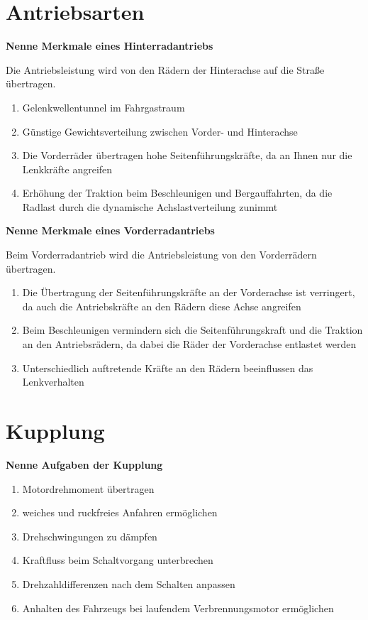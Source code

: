 \section{Antriebsarten}\label{antriebsarten}

\textbf{Nenne Merkmale eines Hinterradantriebs}

Die Antriebsleistung wird von den Rädern der Hinterachse auf die Straße
übertragen.

\begin{enumerate}
\item
  Gelenkwellentunnel im Fahrgastraum
\item
  Günstige Gewichtsverteilung zwischen Vorder- und Hinterachse
\item
  Die Vorderräder übertragen hohe Seitenführungskräfte, da an Ihnen nur
  die Lenkkräfte angreifen
\item
  Erhöhung der Traktion beim Beschleunigen und Bergauffahrten, da die
  Radlast durch die dynamische Achslastverteilung zunimmt
\end{enumerate}

\textbf{Nenne Merkmale eines Vorderradantriebs}

Beim Vorderradantrieb wird die Antriebsleistung von den Vorderrädern
übertragen.

\begin{enumerate}
\item
  Die Übertragung der Seitenführungskräfte an der Vorderachse ist
  verringert, da auch die Antriebskräfte an den Rädern diese Achse
  angreifen
\item
  Beim Beschleunigen vermindern sich die Seitenführungskraft und die
  Traktion an den Antriebsrädern, da dabei die Räder der Vorderachse
  entlastet werden
\item
  Unterschiedlich auftretende Kräfte an den Rädern beeinflussen das
  Lenkverhalten
\end{enumerate}

\section{Kupplung}\label{kupplung}

\textbf{Nenne Aufgaben der Kupplung}

\begin{enumerate}
\item
  Motordrehmoment übertragen
\item
  weiches und ruckfreies Anfahren ermöglichen
\item
  Drehschwingungen zu dämpfen
\item
  Kraftfluss beim Schaltvorgang unterbrechen
\item
  Drehzahldifferenzen nach dem Schalten anpassen
\item
  Anhalten des Fahrzeugs bei laufendem Verbrennungsmotor ermöglichen
\end{enumerate}

